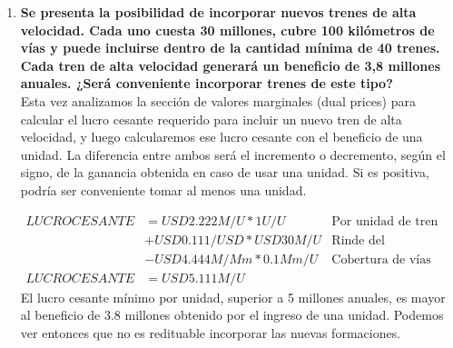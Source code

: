 \documentclass[10pt, a4paper, titlepage,
	oneside,
	fleqn, leqno]{article}
\begin{document}
\begin{enumerate} [a .]
	Empecemos por el presupuesto:
\begin{align*}
	PRESUPUESTO_{TRENES}	&= USD20M/U * 50U\\
	PRESUPUESTO_{TRENES}	&= USD1000M\\
	PRESUPUESTO_{VIAS}	&= PRESUPUESTO - PRESUPUESTO_{TRENES}\\
		&= USD1000M - USD1000M\\
	PRESUPUESTO_{VIAS}	&=0\\
\end{align*}
Vemos que sólamente hay presupuesto para la compra de trenes, y no se compran nuevas vías.

	Ahora analizamos la cobertura:
\begin{align*}
	VIASCUBIERTAS_b	&= min(48Mm, 1050U * 0.05Mm/U)\\
		&= min(48Mm, 52.5Mm)\\
	VIASCUBIERTAS_b	&= 48Mm
\end{align*}
Vemos que se cubre completamente la infraestructura vial actual.

	Ahora analicemos los ingresos:
\begin{align*}
	INGRESOS_b	&= USD2M/U * 1050U + USD10M/Mm * 48Mm\\
		&= USD2100M + USD480M\\
	INGRESOS_b	&= USD2580M
\end{align*}
Vemos que la solución de 2580 millones de USD es, efectivamente, peor que la original de 2600 millones de USD.

\item \textbf{Se presenta la posibilidad de incorporar nuevos trenes de alta velocidad. Cada uno cuesta 30 millones, cubre 100 kilómetros de vías y puede incluirse dentro de la cantidad mínima de 40 trenes. Cada tren de alta velocidad generará un beneficio de 3,8 millones anuales. ¿Será conveniente incorporar trenes de este tipo?}\\
	Esta vez analizamos la sección de valores marginales (dual prices) para calcular el lucro cesante requerido para incluir un nuevo tren de alta velocidad, y luego calcularemos ese lucro cesante con el beneficio de una unidad.
La diferencia entre ambos será el incremento o decremento, según el signo, de la ganancia obtenida en caso de usar una unidad.
Si es positiva, podría ser conveniente tomar al menos una unidad.

\begin{align*}
	LUCROCESANTE	&= USD2.222M/U * 1U/U &\text{Por unidad de tren reemplazada}\\
					& + USD0.111/USD * USD30M/U &\text{Rinde del presupuesto}\\
					& - USD4.444M/Mm * 0.1Mm/U &\text{Cobertura de vías}\\
	LUCROCESANTE	&= USD5.111M/U
\end{align*}
El lucro cesante mínimo por unidad, superior a 5 millones anuales, es mayor al beneficio de 3.8 millones obtenido por el ingreso de una unidad.
Podemos ver entonces que no es redituable incorporar las nuevas formaciones.

\end{enumerate}

\appendix

\end{document}
